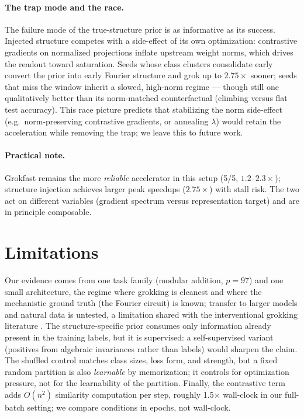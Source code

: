 \documentclass[11pt]{article}
\begin{document}
\paragraph{The trap mode and the race.}
The failure mode of the true-structure prior is as informative as its success. Injected structure
competes with a side-effect of its own optimization: contrastive gradients on normalized
projections inflate upstream weight norms, which drives the readout toward saturation. Seeds
whose class clusters consolidate early convert the prior into early Fourier structure and grok
up to $2.75\times$ sooner; seeds that miss the window inherit a slowed, high-norm regime ---
though still one qualitatively better than its norm-matched counterfactual (climbing versus flat
test accuracy). This race picture predicts that stabilizing the norm side-effect (e.g.\
norm-preserving contrastive gradients, or annealing $\lambda$) would retain the acceleration
while removing the trap; we leave this to future work.

\paragraph{Practical note.}
Grokfast remains the more \emph{reliable} accelerator in this setup (5/5, $1.2$--$2.3\times$);
structure injection achieves larger peak speedups ($2.75\times$) with stall risk. The two act on
different variables (gradient spectrum versus representation target) and are in principle
composable.

\section{Limitations}
Our evidence comes from one task family (modular addition, $p=97$) and one small architecture, the
regime where grokking is cleanest and where the mechanistic ground truth (the Fourier circuit) is
known; transfer to larger models and natural data is untested, a limitation shared with the
interventional grokking literature \citep{radialsuppression2026, weightnormdelay2026}. The
structure-specific prior consumes only information already present in the training labels, but it
is supervised: a self-supervised variant (positives from algebraic invariances rather than labels)
would sharpen the claim. The shuffled control matches class sizes, loss form, and strength, but a
fixed random partition is also \emph{learnable} by memorization; it controls for optimization
pressure, not for the learnability of the partition. Finally, the contrastive term adds
$O(n^2)$ similarity computation per step, roughly 1.5$\times$ wall-clock in our full-batch
setting; we compare conditions in epochs, not wall-clock.
\end{document}
